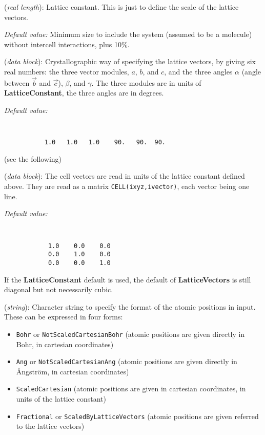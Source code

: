 \begin{description}
\itemsep 10pt
\parsep 0pt


\item[{\bf LatticeConstant}] ({\it real length}): 
Lattice constant. This is just to define the scale of the lattice vectors.

{\it Default value:} Minimum size to include the system (assumed to be a 
molecule) without intercell interactions, plus 10\%. 

\item[{\bf LatticeParameters}] ({\it data block}): 
Crystallographic way of specifying the lattice vectors, by giving
six real numbers: the three vector modules, $a$, $b$, and $c$, and
the three angles $\alpha$ (angle between $\vec b$ and $\vec c$),
$\beta$, and $\gamma$. The three modules are in units of 
{\bf LatticeConstant}, the three angles are in degrees.

{\it Default value:}
{\tt
\begin{verbatim}
           1.0   1.0   1.0    90.   90.  90.
\end{verbatim}
}
\noindent
(see the following)

\item[{\bf LatticeVectors}] ({\it data block}): 
The cell vectors are read in units of the lattice constant defined above. 
They are read as a matrix {\tt CELL(ixyz,ivector)}, each vector being
one line.

{\it Default value:} 
{\tt 
\begin{verbatim}
            1.0    0.0    0.0 
            0.0    1.0    0.0 
            0.0    0.0    1.0 
\end{verbatim}
}
\noindent
If the {\bf LatticeConstant} default is used, the default of 
{\bf LatticeVectors} is still diagonal but not necessarily cubic.

\item[{\bf AtomicCoordinatesFormat}] ({\it string}): 
Character string to specify the format of the atomic positions in
input. These can be expressed in four forms:
\begin{itemize}
\item {\tt Bohr} or {\tt NotScaledCartesianBohr} (atomic positions 
are given directly in Bohr, in cartesian coordinates)
\item {\tt Ang} or {\tt NotScaledCartesianAng} (atomic positions 
are given directly in {\AA}ngstr\"om, in cartesian coordinates)
\item {\tt ScaledCartesian} (atomic positions are given 
in cartesian coordinates, in units of the lattice constant)
\item {\tt Fractional} or {\tt ScaledByLatticeVectors} (atomic positions 
are given referred to the lattice vectors)
\end{itemize}


\end{description}
